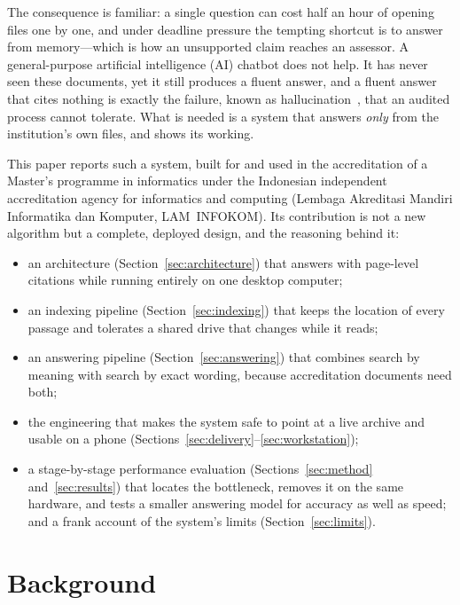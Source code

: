 \documentclass[conference]{IEEEtran}
\begin{document}
The consequence is familiar: a single question can cost half an hour of opening
files one by one, and under deadline pressure the tempting shortcut is to answer
from memory---which is how an unsupported claim reaches an assessor. A
general-purpose artificial intelligence (AI) chatbot does not help. It has never seen these documents, yet it
still produces a fluent answer, and a fluent answer that cites nothing is
exactly the failure, known as hallucination~\cite{ji}, that an audited process
cannot tolerate. What is needed is a system that answers \emph{only} from the
institution's own files, and shows its working.

This paper reports such a system, built for and used in the accreditation of a
Master's programme in informatics under the Indonesian independent accreditation
agency for informatics and computing (Lembaga Akreditasi Mandiri Informatika dan
Komputer, LAM~INFOKOM). Its contribution is not a
new algorithm but a complete, deployed design, and the reasoning behind it:
\begin{itemize}
\item an architecture (Section~\ref{sec:architecture}) that answers with
  page-level citations while running entirely on one desktop computer;
\item an indexing pipeline (Section~\ref{sec:indexing}) that keeps the location
  of every passage and tolerates a shared drive that changes while it reads;
\item an answering pipeline (Section~\ref{sec:answering}) that combines search
  by meaning with search by exact wording, because accreditation documents need
  both;
\item the engineering that makes the system safe to point at a live archive and
  usable on a phone (Sections~\ref{sec:delivery}--\ref{sec:workstation});
\item a stage-by-stage performance evaluation (Sections~\ref{sec:method}
  and~\ref{sec:results}) that locates the bottleneck, removes it on the same
  hardware, and tests a smaller answering model for accuracy as well as speed;
  and a frank account of the system's limits (Section~\ref{sec:limits}).
\end{itemize}

\section{Background}
\end{document}
